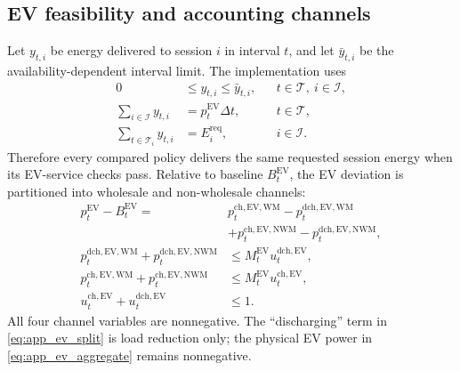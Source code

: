 \documentclass[final,5p,times]{elsarticle}
\newcommand{\dt}{\Delta t}
\newcommand{\EV}{\mathrm{EV}}
\newcommand{\WM}{\mathrm{WM}}
\newcommand{\NWM}{\mathrm{NWM}}
\newcommand{\ch}{\mathrm{ch}}
\newcommand{\dch}{\mathrm{dch}}
\newcommand{\req}{\mathrm{req}}
\newcommand{\calT}{\mathcal{T}}
\newcommand{\calI}{\mathcal{I}}
\begin{document}
\subsection{EV feasibility and accounting channels}
Let $y_{t,i}$ be energy delivered to session $i$ in interval $t$, and let
$\bar y_{t,i}$ be the availability-dependent interval limit. The implementation
uses
\begin{align}
0&\le y_{t,i}\le \bar y_{t,i}, &&t\in\calT,\ i\in\calI, \label{eq:app_ev_interval}\\
\sum_{i\in\calI}y_{t,i}&=p_t^{\EV}\dt, &&t\in\calT, \label{eq:app_ev_aggregate}\\
\sum_{t\in\calT_i}y_{t,i}&=E_i^{\req}, &&i\in\calI. \label{eq:app_ev_energy}
\end{align}
Therefore every compared policy delivers the same requested session energy
when its EV-service checks pass. Relative to baseline $B_t^{\EV}$, the EV
deviation is partitioned into wholesale and non-wholesale channels:
\begin{align}
p_t^{\EV}-B_t^{\EV}
={}&p_t^{\ch,\EV,\WM}-p_t^{\dch,\EV,\WM}\nonumber\\
&+p_t^{\ch,\EV,\NWM}-p_t^{\dch,\EV,\NWM}, \label{eq:app_ev_split}\\
p_t^{\dch,\EV,\WM}+p_t^{\dch,\EV,\NWM}
&\le M_t^{\EV}u_t^{\dch,\EV}, \label{eq:app_ev_dch_binary}\\
p_t^{\ch,\EV,\WM}+p_t^{\ch,\EV,\NWM}
&\le M_t^{\EV}u_t^{\ch,\EV}, \label{eq:app_ev_ch_binary}\\
u_t^{\ch,\EV}+u_t^{\dch,\EV}&\le1. \label{eq:app_ev_direction}
\end{align}
All four channel variables are nonnegative. The ``discharging'' term in
\eqref{eq:app_ev_split} is load reduction only; the physical EV power in
\eqref{eq:app_ev_aggregate} remains nonnegative.
\end{document}
